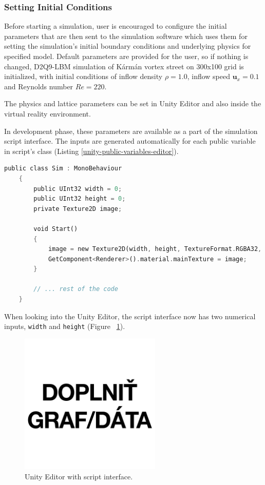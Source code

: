 \subsubsection{Setting Initial Conditions}

Before starting a simulation, user is encouraged to configure the initial parameters that are then sent to the simulation software which uses them for setting the simulation's initial boundary conditions and underlying physics for specified model. Default parameters are provided for the user, so if nothing is changed, D2Q9-LBM simulation of Kármán vortex street on 300x100 grid is initialized, with initial conditions of inflow density $\rho = 1.0$, inflow speed $\bm{u}_x = 0.1$ and Reynolds number $Re = 220$.

The physics and lattice parameters can be set in Unity Editor and also inside the virtual reality environment.

In development phase, these parameters are available as a part of the simulation script interface. The inputs are generated automatically for each public variable in script's class (Listing \ref{unity-public-variables-editor}).

\begin{lstlisting}[language=Rust, caption=Boundary conditions at solid nodes., label=unity-public-variables-editor]
	public class Sim : MonoBehaviour
	{
		public UInt32 width = 0;
		public UInt32 height = 0;
		private Texture2D image;
		
		void Start()
		{
			image = new Texture2D(width, height, TextureFormat.RGBA32, false);
			GetComponent<Renderer>().material.mainTexture = image;
		}
		
		// ... rest of the code
	}
\end{lstlisting}

When looking into the Unity Editor, the script interface now has two numerical inputs, \texttt{width} and \texttt{height} (Figure~ \ref{fig:unity-script-interface-public-vars}).

\begin{figure}[!ht]
	\centering
	\includegraphics[width=0.6\textwidth]{figures/empty.jpg}
	\caption{Unity Editor with script interface.}
	\label{fig:unity-script-interface-public-vars}
\end{figure}




